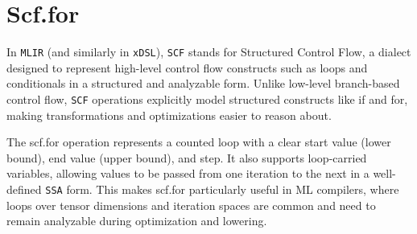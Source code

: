 \documentclass[../main.tex]{subfiles}
\begin{document}
\section{Scf.for}
In \texttt{MLIR} (and similarly in \texttt{xDSL}), \texttt{SCF} stands for Structured Control Flow, a dialect designed to represent high-level control flow
constructs such as loops and conditionals in a structured and analyzable form. Unlike low-level branch-based control flow,
\texttt{SCF} operations explicitly model structured constructs like if and for, making transformations and optimizations easier to reason about.

The scf.for operation represents a counted loop with a clear start value (lower bound), end value (upper bound),
and step. It also supports loop-carried variables, allowing values to be passed from one iteration to the next
in a well-defined \texttt{SSA} form. This makes scf.for particularly useful in ML compilers, where loops over tensor
dimensions and iteration spaces are common and need to remain analyzable during optimization and lowering.
\end{document}
